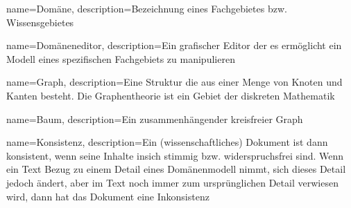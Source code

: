 {
  name=Domäne,
  description={Bezeichnung eines Fachgebietes bzw. Wissensgebietes}
}

{
  name=Domäneneditor,
  description={Ein grafischer Editor der es ermöglicht ein Modell eines spezifischen Fachgebiets zu manipulieren}
}

{
  name=Graph,
  description={Eine Struktur die aus einer Menge von Knoten und Kanten besteht. Die Graphentheorie ist ein Gebiet der diskreten Mathematik}
}

{
  name=Baum,
  description={Ein zusammenhängender kreisfreier Graph}
}

{
  name=Konsistenz,
  description={Ein (wissenschaftliches) Dokument ist dann konsistent, wenn seine Inhalte insich stimmig bzw. widerspruchsfrei sind. Wenn ein Text Bezug zu einem Detail eines Domänenmodell nimmt, sich dieses Detail jedoch ändert, aber im Text noch immer zum ursprünglichen Detail verwiesen wird, dann hat das Dokument eine Inkonsistenz}
}



